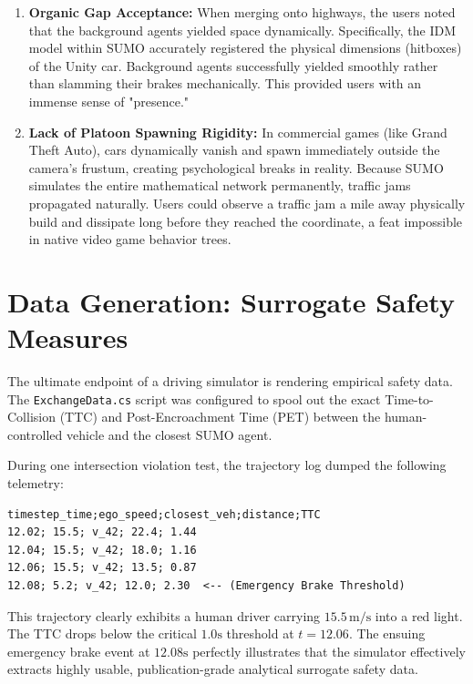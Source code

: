 \begin{enumerate}
    \item \textbf{Organic Gap Acceptance:} When merging onto highways, the users noted that the background agents yielded space dynamically. Specifically, the IDM model within SUMO accurately registered the physical dimensions (hitboxes) of the Unity car. Background agents successfully yielded smoothly rather than slamming their brakes mechanically. This provided users with an immense sense of "presence."
    \item \textbf{Lack of Platoon Spawning Rigidity:} In commercial games (like Grand Theft Auto), cars dynamically vanish and spawn immediately outside the camera's frustum, creating psychological breaks in reality. Because SUMO simulates the entire mathematical network permanently, traffic jams propagated naturally. Users could observe a traffic jam a mile away physically build and dissipate long before they reached the coordinate, a feat impossible in native video game behavior trees.
\end{enumerate}

\section{Data Generation: Surrogate Safety Measures}

The ultimate endpoint of a driving simulator is rendering empirical safety data. The \texttt{ExchangeData.cs} script was configured to spool out the exact Time-to-Collision (TTC) and Post-Encroachment Time (PET) between the human-controlled vehicle and the closest SUMO agent.

During one intersection violation test, the trajectory log dumped the following telemetry:
\begin{lstlisting}
timestep_time;ego_speed;closest_veh;distance;TTC
12.02; 15.5; v_42; 22.4; 1.44
12.04; 15.5; v_42; 18.0; 1.16
12.06; 15.5; v_42; 13.5; 0.87
12.08; 5.2; v_42; 12.0; 2.30  <-- (Emergency Brake Threshold)
\end{lstlisting}

This trajectory clearly exhibits a human driver carrying $15.5 \, \text{m}/\text{s}$ into a red light. The TTC drops below the critical $1.0\text{s}$ threshold at $t=12.06$. The ensuing emergency brake event at $12.08\text{s}$ perfectly illustrates that the simulator effectively extracts highly usable, publication-grade analytical surrogate safety data.

